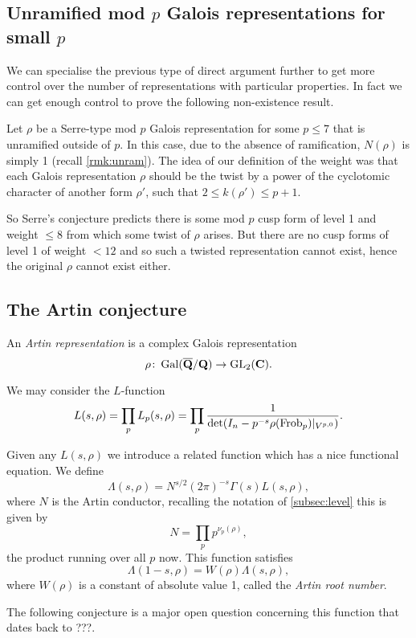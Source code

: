 \documentclass[a4paper,12pt]{article}
\begin{document}
\subsection{Unramified mod $p$ Galois representations for small $p$}\label{subsec:small}
We can specialise the previous type of direct argument further to get more control over the number of representations with particular properties.
In fact we can get enough control to prove the following non-existence result.

Let $\rho$ be a Serre-type mod $p$ Galois representation for some $p \le 7$ that is unramified outside of $p$.
In this case, due to the absence of ramification, $N(\rho)$ is simply 1 (recall \cref{rmk:unram}).
The idea of our definition of the weight was that each Galois representation $\rho$ should be the twist by a power of the cyclotomic character of another form $\rho'$, such that $ 2\le k(\rho')\le p + 1$.

So Serre's conjecture predicts there is some mod $p$ cusp form of level 1 and weight $\le 8$ from which some twist of $\rho$ arises.
But there are no cusp forms of level 1 of weight $< 12$ and so such a twisted representation cannot exist, hence the original $\rho$ cannot exist either.


\subsection{The Artin conjecture}\label{sec:artin}
\begin{defn}
An \emph{Artin representation} is a complex Galois representation
\[
\rho\colon \operatorname{Gal}(\overline{\mathbf{Q}}/\mathbf{Q}) \to \operatorname{GL}_2(\mathbf{C}).
\]
\end{defn}

We may consider the $L$-function
\[
L(s, \rho) = \prod_{p} L_p(s,\rho) = \prod_{p} \frac{1}{\det(I_n - p^{-s}\rho(\operatorname{Frob}_p) |_{V^{p,0}})}.
\]

Given any $L(s,\rho)$ we introduce a related function which has a nice functional equation.
We define
\[
\Lambda(s, \rho) = N^{s/2} (2\pi)^{-s} \Gamma(s)L(s,\rho),
\]
where $N$ is the Artin conductor, recalling the notation of \cref{subsec:level} this is given by
\[
N = \prod_{p}p^{\nu_p(\rho)},
\]
the product running over all $p$ now.
This function satisfies
\[
\Lambda(1-s, \rho) = W(\rho)\Lambda(s,\rho),
\]
where $W(\rho)$ is a constant of absolute value 1, called the \emph{Artin root number}.

The following conjecture is a major open question concerning this function that dates back to ???. %
\end{document}
